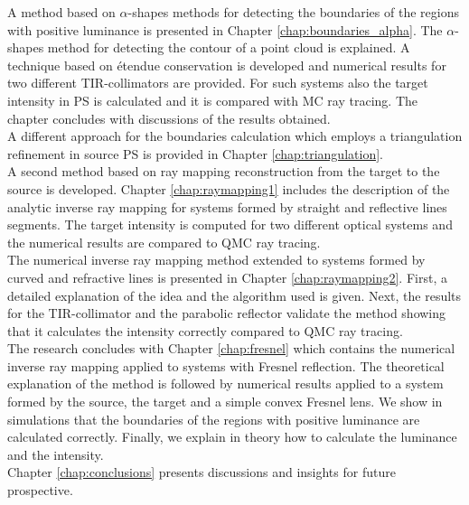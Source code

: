 A method based on $\alpha$-shapes methods for detecting the boundaries of the regions with positive luminance is presented in Chapter \ref{chap:boundaries_alpha}. The $\alpha$-shapes method for detecting the contour of a point cloud is explained. A technique based on \'{e}tendue conservation is developed and numerical results for two different TIR-collimators are provided. For such systems also the target intensity in PS is calculated and it is compared with MC ray tracing. The chapter concludes with discussions of the results obtained.\\ \indent
A different approach for the boundaries calculation which employs a triangulation refinement in source PS is provided in Chapter \ref{chap:triangulation}.  
\\ \indent A second method based on ray mapping reconstruction from the target to the source is developed. Chapter \ref{chap:raymapping1} includes the description of the analytic inverse ray mapping for systems formed by straight and reflective lines segments. The target intensity is computed for two different optical systems and the numerical results are compared to QMC ray tracing. \\ \indent The numerical inverse ray mapping method extended to systems formed by curved and refractive lines is presented in
Chapter \ref{chap:raymapping2}. First, a detailed explanation of the idea and the algorithm used is given. Next, the results for the TIR-collimator and the parabolic reflector validate the method showing that it calculates the intensity correctly compared to QMC ray tracing. \\ \indent
The research concludes with Chapter \ref{chap:fresnel} which contains the numerical inverse ray mapping applied to systems with Fresnel reflection. The theoretical explanation of the method is followed by numerical results applied to a system formed by the source, the target and a simple convex Fresnel lens. We show in simulations that the boundaries of the regions with positive luminance are calculated correctly. Finally, we explain in theory how to calculate the luminance and the intensity.
 \\ \indent Chapter \ref{chap:conclusions} presents discussions and insights for future prospective.
\clearpage{\pagestyle{empty}\cleardoublepage}
 